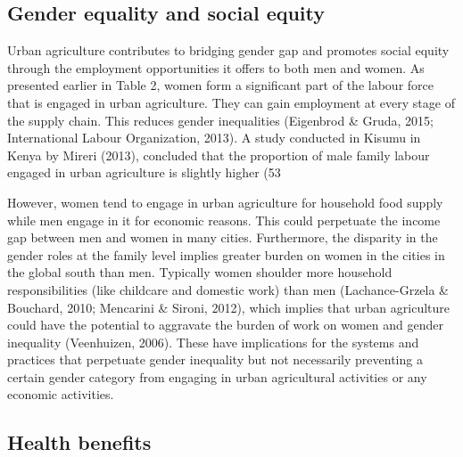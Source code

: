 \subsection{Gender equality and social equity}

Urban agriculture contributes to bridging gender gap and promotes social equity through the employment opportunities it offers to both men and women. As presented earlier in Table 2, women form a significant part of the labour force that is engaged in urban agriculture. They can gain employment at every stage of the supply chain. This reduces gender inequalities (Eigenbrod & Gruda, 2015; International Labour Organization, 2013). A study conducted in Kisumu in Kenya by Mireri (2013), concluded that the proportion of male family labour engaged in urban agriculture is slightly higher (53%

However, women tend to engage in urban agriculture for household food supply while men engage in it for economic reasons. This could perpetuate the income gap between men and women in many cities. Furthermore, the disparity in the gender roles at the family level implies greater burden on women in the cities in the global south than men. Typically women shoulder more household responsibilities (like childcare and domestic work) than men (Lachance-Grzela & Bouchard, 2010; Mencarini & Sironi, 2012), which implies that urban agriculture could have the potential to aggravate the burden of work on women and gender inequality (Veenhuizen, 2006). These have implications for the systems and practices that perpetuate gender inequality but not necessarily preventing a certain gender category from engaging in urban agricultural activities or any economic activities.

\subsection{Health benefits}

